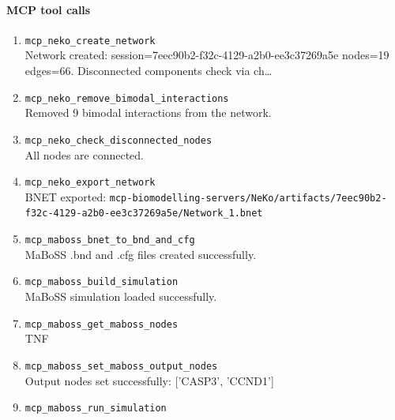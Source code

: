 \paragraph{MCP tool calls}
\begingroup
\small
\setlength{\itemsep}{5pt}
\setlength{\parskip}{0pt}
\begin{enumerate}
\item[1.] \texttt{mcp\_\allowbreak{}neko\_\allowbreak{}create\_\allowbreak{}network}
\hfill\\
\RaggedRight Network created: session=7eec90b2-f32c-4129-a2b0-ee3c37269a5e nodes=19 edges=66. Disconnected components check via ch\ldots{}
\item[2.] \texttt{mcp\_\allowbreak{}neko\_\allowbreak{}remove\_\allowbreak{}bimodal\_\allowbreak{}interactions}
\hfill\\
\RaggedRight Removed 9 bimodal interactions from the network.
\item[3.] \texttt{mcp\_\allowbreak{}neko\_\allowbreak{}check\_\allowbreak{}disconnected\_\allowbreak{}nodes}
\hfill\\
\RaggedRight All nodes are connected.
\item[4.] \texttt{mcp\_\allowbreak{}neko\_\allowbreak{}export\_\allowbreak{}network}
\hfill\\
\RaggedRight BNET exported: \texttt{mcp-\allowbreak{}biomodelling-\allowbreak{}servers/\allowbreak{}NeKo/\allowbreak{}artifacts/\allowbreak{}7eec90b2-\allowbreak{}f32c-\allowbreak{}4129-\allowbreak{}a2b0-\allowbreak{}ee3c37269a5e/\allowbreak{}Network\_\allowbreak{}1.\allowbreak{}bnet}
\item[5.] \texttt{mcp\_\allowbreak{}maboss\_\allowbreak{}bnet\_\allowbreak{}to\_\allowbreak{}bnd\_\allowbreak{}and\_\allowbreak{}cfg}
\hfill\\
\RaggedRight MaBoSS .bnd and .cfg files created successfully.
\item[6.] \texttt{mcp\_\allowbreak{}maboss\_\allowbreak{}build\_\allowbreak{}simulation}
\hfill\\
\RaggedRight MaBoSS simulation loaded successfully.
\item[7.] \texttt{mcp\_\allowbreak{}maboss\_\allowbreak{}get\_\allowbreak{}maboss\_\allowbreak{}nodes}
\hfill\\
\RaggedRight TNF
\item[8.] \texttt{mcp\_\allowbreak{}maboss\_\allowbreak{}set\_\allowbreak{}maboss\_\allowbreak{}output\_\allowbreak{}nodes}
\hfill\\
\RaggedRight Output nodes set successfully: ['CASP3', 'CCND1']
\item[9.] \texttt{mcp\_\allowbreak{}maboss\_\allowbreak{}run\_\allowbreak{}simulation}

\end{enumerate}
